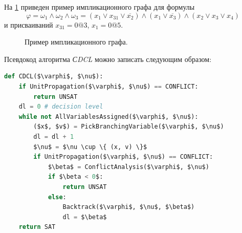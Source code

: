 На \figurename{ \ref{chapter1:fig:impgraph}} приведен пример импликационного графа для формулы 
$$
\varphi = \omega_1 \land \omega_2 \land \omega_3 = 
\left(x_1 \lor x_{31} \lor \overline{x_2} \right)
\land
\left(x_1 \lor \overline{x_3} \right)
\land
\left(x_2 \lor x_3 \lor x_4 \right)
$$
и присваиваний $x_{31} = 0@3$, $x_1 = 0@5$.

\begin{figure}[h]
\centering
\captionsetup{justification=centering}
\caption{Пример импликационного графа.}
\label{chapter1:fig:impgraph}
\end{figure}

Псевдокод алгоритма \textit{СDCL} можно записать следующим образом:

\begin{lstlisting}[language=Python, mathescape=true]
def CDCL($\varphi$, $\nu$):	
	if UnitPropagation($\varphi$, $\nu$) == CONFLICT:
		return UNSAT
	dl = 0 # decision level
	while not AllVariablesAssigned($\varphi$, $\nu$):
		($x$, $v$) = PickBranchingVariable($\varphi$, $\nu$)
		dl = dl + 1
		$\nu$ = $\nu \cup \{ (x, v) \}$
		if UnitPropagation($\varphi$, $\nu$) == CONFLICT:
			$\beta$ = ConflictAnalysis($\varphi$, $\nu$)
			if $\beta < 0$:
				return UNSAT
			else:
				Backtrack($\varphi$, $\nu$, $\beta$)
				dl = $\beta$
	return SAT
\end{lstlisting}

